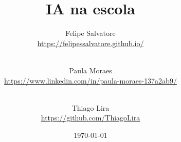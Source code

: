 \title{IA na escola}
\date{\today}

\author{
  Felipe Salvatore\\
  \url{https://felipessalvatore.github.io/}
  \vspace{0.1 cm}
  \and\\ 
  Paula Moraes\\
  \url{https://www.linkedin.com/in/paula-moraes-137a2ab9/}\vspace{0.1 cm}
  \and\\ 
  Thiago Lira\\
  \url{https://github.com/ThiagoLira}\\\vspace{0.1 cm}
}



